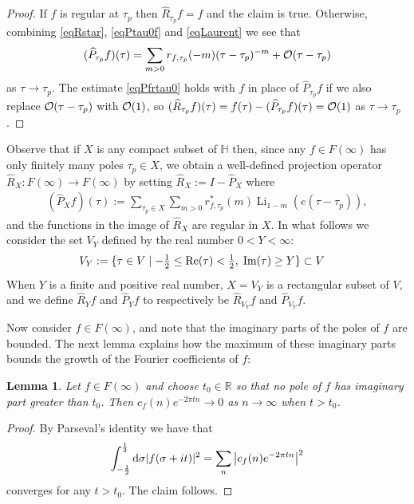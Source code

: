 \documentclass[11pt,a4paper]{article}
\newtheorem{lem}[thm]{Lemma}
\def\R{\mathbb{R}}
\newcommand{\Li}{\operatorname{Li}}     			%
\newcommand{\HH}{{\mathbb H}}				%
\newcommand{\PF}{\widehat{P}} 				%
\newcommand{\RF}{\widehat{R}} 				%
\begin{document}
\begin{proof}
If $f$ is regular at $\tau_p$ then $\RF_{\tau_p}f=f$ and the claim is true. Otherwise, combining \eqref{eqRstar}, \eqref{eqPtau0f} and \eqref{eqLaurent} we see that
\begin{align}\label{eqPfrtau0}
	(\PF_{\tau_p}f)(\tau)
	=\sum_{m>0}r_{f,\tau_p}(-m)(\tau-\tau_p)^{-m}+{\cal O}(\tau-\tau_p)
\end{align}
as $\tau\to \tau_p$. The estimate \eqref{eqPfrtau0} holds with $f$ in place of $\PF_{\tau_p}f$ if we also replace ${\cal O}(\tau-\tau_p)$ with ${\cal O}(1)$, so $(\RF_{\tau_p}f)(\tau)=f(\tau)-(\PF_{\tau_p}f)(\tau)={\cal O}(1)$ as $\tau\to\tau_p$.
\end{proof}

Observe that if $X$ is any compact subset of $\HH$ then, since any $f\in F(\infty)$ has only finitely many poles $\tau_p \in X$, we obtain a well-defined projection operator $\RF_X:F(\infty)\to F(\infty)$ by setting $\RF_X:=I-\PF_X$ where 
\begin{align}
(\PF_Xf)(\tau):=
\sum_{\tau_p\in X}\sum_{m>0}r^*_{f,\tau_p}(m)\Li_{1-m}\left(e(\tau-\tau_p)\right),
\end{align} 
and the functions in the image of $\RF_X$ are regular in $X$. In what follows we consider the set $V_Y$ defined by the real number $0 < Y < \infty$:
\begin{align}
V_Y&:=\{\tau\in V \mid -\tfrac12\leq {\rm Re}(\tau)<\tfrac12,\;{\rm Im}(\tau)\geq Y\} \subset V 
\label{eqVY}
\end{align}
When $Y$ is a finite and positive real number, $X = V_Y$ is a rectangular subset of $V$, and we define $\RF_Y f$ and $\PF_Y f$ to respectively be $\RF_{V_Y} f$ and $\PF_{V_Y}f$.

Now consider $f\in F(\infty)$, and note that the imaginary parts of the poles of $f$ are bounded. The next lemma explains how the maximum of these imaginary parts bounds the growth of the Fourier coefficients of $f$:

\begin{lem}\label{LemRegC2}
Let $f\in F(\infty)$ and choose $t_0\in \R$ so that no pole of $f$ has imaginary part greater than $t_0$. Then $c_f(n)e^{-2\pi tn}\to 0$ as $n\to \infty$ when $t>t_0$.
\end{lem}

\begin{proof}
By Parseval's identity we have that
\begin{align}
\int_{-\frac12}^{\frac12} {\rm d}\sigma | f(\sigma + i t)|^2 = \sum_{n} \big| c_f(n) e^{- 2 \pi tn}\big|^2 
\end{align}
converges for any $t>t_0$. The claim follows.
\end{proof}
\end{document}
